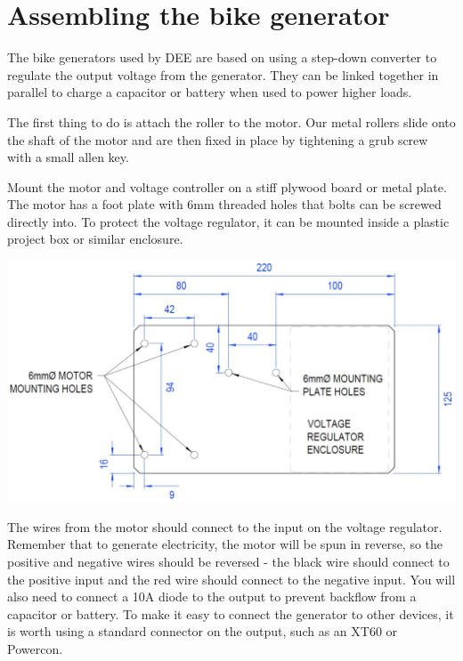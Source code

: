 \documentclass{article}
\theoremstyle{definition}
\theoremstyle{definition}
\theoremstyle{remark}
\begin{document}

\section{Assembling the bike generator} %
\label{sec:assembling_the_bike_generator}

  The bike generators used by DEE are based on using a step-down converter to regulate the output voltage from the generator. They can be linked together in parallel to charge a capacitor or battery when used to power higher loads.

  The first thing to do is attach the roller to the motor. Our metal rollers slide onto the shaft of the motor and are then fixed in place by tightening a grub screw with a small allen key. 

  Mount the motor and voltage controller on a stiff plywood board or metal plate. The motor has a foot plate with 6mm threaded holes that bolts can be screwed directly into. To protect the voltage regulator, it can be mounted inside a plastic project box or similar enclosure. 

  \begin{center}
    \includegraphics[width=0.75\paperwidth]{Images/image_4_1_(mounting_board).png}
  \end{center}

  The wires from the motor should connect to the input on the voltage regulator. Remember that to generate electricity, the motor will be spun in reverse, so the positive and negative wires should be reversed - the black wire should connect to the positive input and the red wire should connect to the negative input. You will also need to connect a 10A diode to the output to prevent backflow from a capacitor or battery. To make it easy to connect the generator to other devices, it is worth using a standard connector on the output, such as an XT60 or Powercon.
\end{document}
